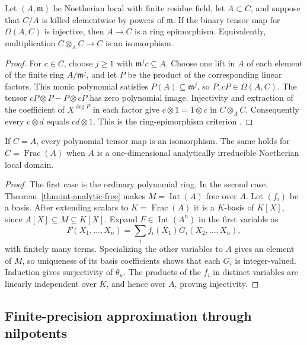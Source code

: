 \begin{lemma}
\label{lem:binary-effective-epimorphism}
Let $(A,\mathfrak m)$ be Noetherian local with finite residue field,
let $A\subset C$, and suppose that $C/A$ is killed elementwise by
powers of $\mathfrak m$.  If the binary tensor map for
$\Omega(A,C)$ is injective, then
$A\to C$ is a ring epimorphism.  Equivalently, multiplication
$C\otimes_A C\to C$ is an isomorphism.
\end{lemma}
\begin{proof}
For $c\in C$, choose $j\ge1$ with $\mathfrak m^jc\subseteq A$.
Choose one lift in $A$ of each element of the finite ring
$A/\mathfrak m^j$, and let $P$ be the product of the corresponding
linear factors.  This monic polynomial satisfies
$P(A)\subseteq\mathfrak m^j$, so $P,cP\in\Omega(A,C)$.
The tensor $cP\otimes P-P\otimes cP$ has zero polynomial image.
Injectivity and extraction of the coefficient of $X^{\deg P}$
in each factor give
$c\otimes1=1\otimes c$ in $C\otimes_A C$.
Consequently every $c\otimes d$ equals $cd\otimes1$.
This is the ring-epimorphism criterion
\cite[Lemmas 10.107.1--10.107.3, Tag 04VM]{StacksRingEpimorphisms}.
\end{proof}

\begin{lemma}
\label{lem:binary-positive-local}
If $C=A$, every polynomial tensor map is an isomorphism.
The same holds for $C=\operatorname{Frac}(A)$ when $A$ is a
one-dimensional analytically irreducible Noetherian local domain.
\end{lemma}
\begin{proof}
The first case is the ordinary polynomial ring.  In the second case,
Theorem~\ref{thm:int-analytic-free} makes
$M=\operatorname{Int}(A)$ free over $A$.  Let $(f_i)$ be a basis.
After extending scalars to $K=\operatorname{Frac}(A)$ it is a
$K$-basis of $K[X]$, since $A[X]\subseteq M\subseteq K[X]$.
Expand $F\in\operatorname{Int}(A^n)$ in the first variable as
\[
 F(X_1,\ldots,X_n)=\sum_i f_i(X_1)G_i(X_2,\ldots,X_n),
\]
with finitely many terms.  Specializing the other variables to
$A$ gives an element of $M$, so uniqueness of its basis
coefficients shows that each $G_i$ is integer-valued.
Induction gives surjectivity of $\theta_n$.
The products of the $f_i$ in distinct variables are linearly
independent over $K$, and hence over $A$, proving injectivity.
\end{proof}

\subsection{Finite-precision approximation through nilpotents}


